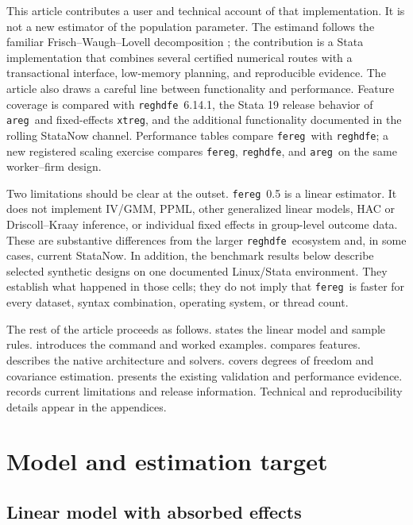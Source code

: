 \documentclass[11pt]{article}
\newcommand{\fereg}{\texttt{fereg}}
\newcommand{\reghdfe}{\texttt{reghdfe}}
\newcommand{\areg}{\texttt{areg}}
\newcommand{\xtreg}{\texttt{xtreg}}
\begin{document}
This article contributes a user and technical account of that implementation.
It is not a new estimator of the population parameter.  The estimand follows
the familiar Frisch--Waugh--Lovell decomposition
\citep{frisch1933partial,lovell1963seasonal}; the contribution is a Stata
implementation that combines several certified numerical routes with a
transactional interface, low-memory planning, and reproducible evidence.
The article also draws a careful line between functionality and performance.
Feature coverage is compared with \reghdfe\ 6.14.1, the Stata 19 release
behavior of \areg\ and fixed-effects \xtreg, and the additional functionality
documented in the rolling StataNow channel.  Performance tables compare
\fereg\ with \reghdfe; a new registered scaling exercise compares \fereg,
\reghdfe, and \areg\ on the same worker--firm design.

Two limitations should be clear at the outset.  \fereg\ 0.5 is a linear
estimator.  It does not implement IV/GMM, PPML, other generalized linear
models, HAC or Driscoll--Kraay inference, or individual fixed effects in
group-level outcome data.  These are substantive differences from the
larger \reghdfe\ ecosystem and, in some cases, current StataNow.  In addition,
the benchmark results below describe selected synthetic designs on one
documented Linux/Stata environment.  They establish what happened in those
cells; they do not imply that \fereg\ is faster for every dataset, syntax
combination, operating system, or thread count.

The rest of the article proceeds as follows.   states the
linear model and sample rules.   introduces the command and
worked examples.   compares features.
 describes the native architecture and solvers.
 covers degrees of freedom and covariance estimation.
 presents the existing validation and performance
evidence.   records current limitations and release
information.  Technical and reproducibility details appear in the appendices.

\section{Model and estimation target}
\label{sec:model}

\subsection{Linear model with absorbed effects}
\end{document}
